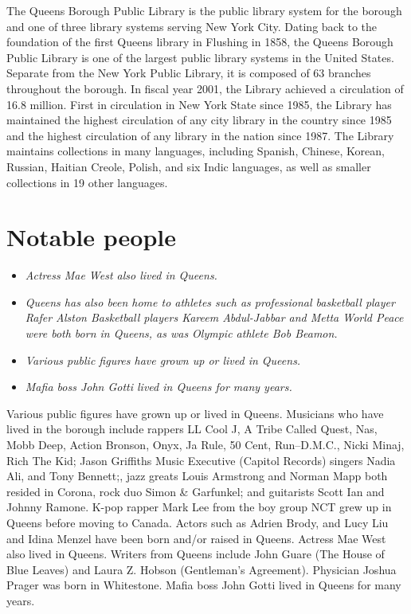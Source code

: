 The Queens Borough Public Library is the public library system for the
borough and one of three library systems serving New York City. Dating
back to the foundation of the first Queens library in Flushing in 1858,
the Queens Borough Public Library is one of the largest public library
systems in the United States. Separate from the New York Public Library,
it is composed of 63 branches throughout the borough. In fiscal year
2001, the Library achieved a circulation of 16.8 million. First in
circulation in New York State since 1985, the Library has maintained the
highest circulation of any city library in the country since 1985 and
the highest circulation of any library in the nation since 1987. The
Library maintains collections in many languages, including Spanish,
Chinese, Korean, Russian, Haitian Creole, Polish, and six Indic
languages, as well as smaller collections in 19 other languages.

\section{Notable people}\label{notable-people}

\begin{itemize}
\item
  \emph{Actress Mae West also lived in Queens.}
\item
  \emph{Queens has also been home to athletes such as professional
  basketball player Rafer Alston Basketball players Kareem Abdul-Jabbar
  and Metta World Peace were both born in Queens, as was Olympic athlete
  Bob Beamon.}
\item
  \emph{Various public figures have grown up or lived in Queens.}
\item
  \emph{Mafia boss John Gotti lived in Queens for many years.}
\end{itemize}

Various public figures have grown up or lived in Queens. Musicians who
have lived in the borough include rappers LL Cool J, A Tribe Called
Quest, Nas, Mobb Deep, Action Bronson, Onyx, Ja Rule, 50 Cent,
Run--D.M.C., Nicki Minaj, Rich The Kid; Jason Griffiths Music Executive
(Capitol Records) singers Nadia Ali, and Tony Bennett;, jazz greats
Louis Armstrong and Norman Mapp both resided in Corona, rock duo Simon
\& Garfunkel; and guitarists Scott Ian and Johnny Ramone. K-pop rapper
Mark Lee from the boy group NCT grew up in Queens before moving to
Canada. Actors such as Adrien Brody, and Lucy Liu and Idina Menzel have
been born and/or raised in Queens. Actress Mae West also lived in
Queens. Writers from Queens include John Guare (The House of Blue
Leaves) and Laura Z. Hobson (Gentleman's Agreement). Physician Joshua
Prager was born in Whitestone. Mafia boss John Gotti lived in Queens for
many years.

